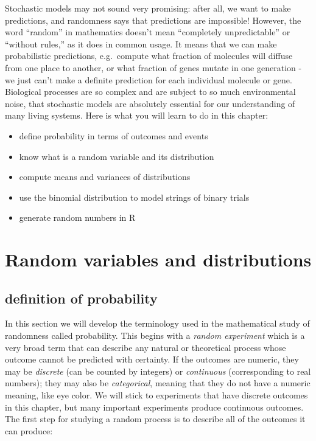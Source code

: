 \documentclass[
  letterpaper,
  DIV=11,
  numbers=noendperiod]{scrreprt}
\begin{document}
Stochastic models may not sound very promising: after all, we want to
make predictions, and randomness says that predictions are impossible!
However, the word ``random'' in mathematics doesn't mean ``completely
unpredictable'' or ``without rules,'' as it does in common usage. It
means that we can make probabilistic predictions, e.g.~compute what
fraction of molecules will diffuse from one place to another, or what
fraction of genes mutate in one generation - we just can't make a
definite prediction for each individual molecule or gene. Biological
processes are so complex and are subject to so much environmental noise,
that stochastic models are absolutely essential for our understanding of
many living systems. Here is what you will learn to do in this chapter:

\begin{itemize}
\item
  define probability in terms of outcomes and events
\item
  know what is a random variable and its distribution
\item
  compute means and variances of distributions
\item
  use the binomial distribution to model strings of binary trials
\item
  generate random numbers in R
\end{itemize}

\hypertarget{random-variables-and-distributions-1}{%
\section{Random variables and
distributions}\label{random-variables-and-distributions-1}}

\label{sec:math4_1}

\hypertarget{definition-of-probability}{%
\subsection{definition of probability}\label{definition-of-probability}}

In this section we will develop the terminology used in the mathematical
study of randomness called probability. This begins with a \emph{random
experiment} which is a very broad term that can describe any natural or
theoretical process whose outcome cannot be predicted with certainty. If
the outcomes are numeric, they may be \emph{discrete} (can be counted by
integers) or \emph{continuous} (corresponding to real numbers); they may
also be \emph{categorical}, meaning that they do not have a numeric
meaning, like eye color. We will stick to experiments that have discrete
outcomes in this chapter, but many important experiments produce
continuous outcomes. The first step for studying a random process is to
describe all of the outcomes it can produce:
\end{document}
